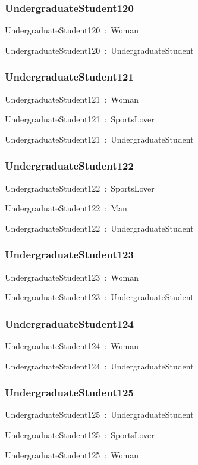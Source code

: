 \documentclass{article}
\begin{document}
\subsubsection*{UndergraduateStudent120}

UndergraduateStudent120~:~Woman

UndergraduateStudent120~:~UndergraduateStudent

\subsubsection*{UndergraduateStudent121}

UndergraduateStudent121~:~Woman

UndergraduateStudent121~:~SportsLover

UndergraduateStudent121~:~UndergraduateStudent

\subsubsection*{UndergraduateStudent122}

UndergraduateStudent122~:~SportsLover

UndergraduateStudent122~:~Man

UndergraduateStudent122~:~UndergraduateStudent

\subsubsection*{UndergraduateStudent123}

UndergraduateStudent123~:~Woman

UndergraduateStudent123~:~UndergraduateStudent

\subsubsection*{UndergraduateStudent124}

UndergraduateStudent124~:~Woman

UndergraduateStudent124~:~UndergraduateStudent

\subsubsection*{UndergraduateStudent125}

UndergraduateStudent125~:~UndergraduateStudent

UndergraduateStudent125~:~SportsLover

UndergraduateStudent125~:~Woman
\end{document}

